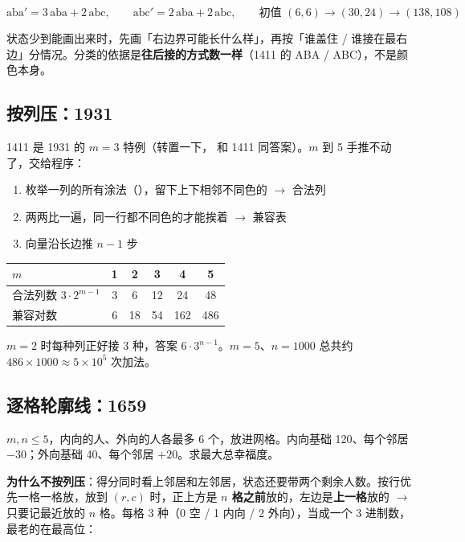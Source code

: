 \[
\mathrm{aba}' = 3\,\mathrm{aba} + 2\,\mathrm{abc}, \qquad \mathrm{abc}' = 2\,\mathrm{aba} + 2\,\mathrm{abc}, \qquad \text{初值 } (6, 6) \to (30, 24) \to (138, 108)
\]

\begin{principle}
状态少到能画出来时，先画「右边界可能长什么样」，再按「谁盖住 / 谁接在最右边」分情况。分类的依据是\textbf{往后接的方式数一样}（1411 的 ABA / ABC），不是颜色本身。
\end{principle}

\subsection{按列压：1931}

1411 是 1931 的 $m = 3$ 特例（转置一下， 和 1411 同答案）。$m$ 到 5 手推不动了，交给程序：
\begin{enumerate}
\item 枚举一列的所有涂法（），留下上下相邻不同色的 $\to$ 合法列
\item 两两比一遍，同一行都不同色的才能挨着 $\to$ 兼容表 
\item {} 向量沿长边推 $n-1$ 步
\end{enumerate}

\begin{center}
\begin{tabular}{@{}l ccccc@{}}
\toprule
$m$ & 1 & 2 & 3 & 4 & 5\\
\midrule
合法列数 $3 \cdot 2^{m-1}$ & 3 & 6 & 12 & 24 & 48\\
兼容对数 & 6 & 18 & 54 & 162 & 486\\
\bottomrule
\end{tabular}
\end{center}

$m = 2$ 时每种列正好接 3 种，答案 $6 \cdot 3^{n-1}$。$m = 5$、$n = 1000$ 总共约 $486 \times 1000 \approx 5 \times 10^5$ 次加法。

\subsection{逐格轮廓线：1659}

$m, n \le 5$，内向的人、外向的人各最多 6 个，放进网格。内向基础 120、每个邻居 $-30$；外向基础 40、每个邻居 $+20$。求最大总幸福度。

\textbf{为什么不按列压}：得分同时看上邻居和左邻居，状态还要带两个剩余人数。按行优先一格一格放，放到 $(r, c)$ 时，正上方是 \textbf{$n$ 格之前}放的，左边是\textbf{上一格}放的 $\to$ 只要记最近放的 $n$ 格。每格 3 种（0 空 / 1 内向 / 2 外向），当成一个 3 进制数，最老的在最高位：

